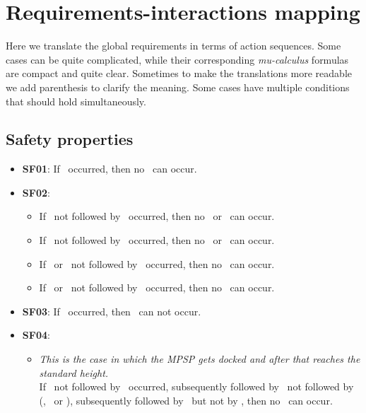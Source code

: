 \section{Requirements-interactions mapping}

Here we translate the global requirements in terms of action sequences. Some cases can be quite complicated, while their corresponding \emph{mu-calculus} formulas are compact and quite clear.
Sometimes to make the translations more readable we add parenthesis to clarify the meaning.
Some cases have multiple conditions that should hold simultaneously.

\subsection{Safety properties}
\begin{itemize}
    \item \textbf{SF01}: If \inEmergencyMode\ occurred, then no \motorizedMovement\ can occur.

    \item \textbf{SF02}:
    \begin{itemize}
        \item If \applyVerticalBrake\ not followed by \releaseVerticalBrake\ occurred, then no \motorUp\ or \motorDown\ can occur.

        \item If \applyHorizontalBrake\ not followed by \releaseHorizontalBrake\ occurred, then no \motorLeft\ or \motorRight\ can occur.

        \item If \motorLeft\ or \motorRight\ not followed by \horizontalMotorOff\ occurred, then no \applyHorizontalBrake\ can occur.

        \item If \motorUp\ or \motorDown\ not followed by \verticalMotorOff\ occurred, then no \applyVerticalBrake\ can occur.
    \end{itemize}

    \item \textbf{SF03}: If \notRightmost\ occurred, then \undock\  can not occur.

    \item \textbf{SF04}:
    \begin{itemize}
        \item \textit{This is the case in which the MPSP gets docked and after that reaches the standard height.}\\
        If \dock\ not followed by \undock\ occurred, subsequently followed by \standardHeightReached\ not followed by (\undock, \motorDown\ or \motorUp), subsequently followed by \pressUp\, but not by \releaseUp, then no \motorLeft\ can occur.


\end{itemize}
\end{itemize}
